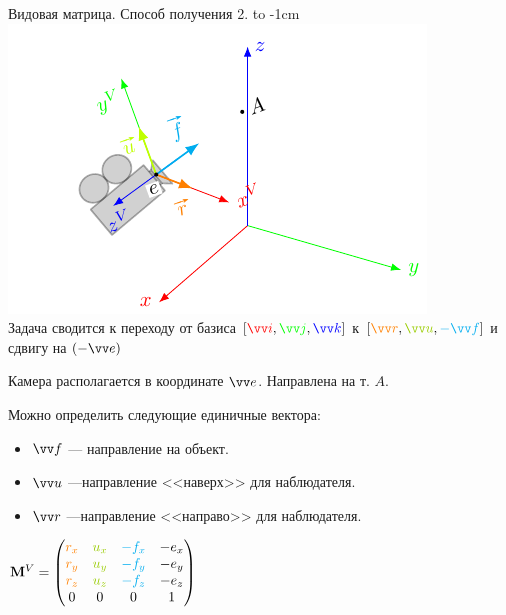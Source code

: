 \documentclass[10pt]{beamer}
\begin{document}
	\begin{frame}{Видовая матрица. Способ получения 2.}
		{
			\hbox to -1cm{}\includegraphics[page=1]{camera.pdf} \\
			
			Задача сводится к переходу от базиса $[ 
			    {\color{red}\vv i}  , 
				{\color{green}\vv j }, 
				{\color{blue}\vv k} 
				]$
				к 
				$[ 
				{\color{orange}\vv r},
				{\color{lime!80!black} \vv u} , 
				{\color{cyan} -\vv f} ]$ и сдвигу на $(-\vv e)$
		}
		{
			Камера располагается в координате $\vv e$. Направлена на т. $A$.
			
			Можно определить следующие единичные вектора:
			\begin{itemize}
				\item {\color{cyan}$\vv f$} --- направление на объект. 
				\item {\color{lime!80!black}$\vv u$} ---направление <<наверх>> для наблюдателя.
				\item {\color{orange}$\vv r$} ---направление <<направо>> для наблюдателя.
			\end{itemize}
			
			$\mathbf M^V = 
			\begin{pmatrix}
				{\color{orange}r_x} & {\color{lime!80!black}u_x} & {\color{cyan}-f_x}& -e_x \\
				{\color{orange}r_y} & {\color{lime!80!black}u_y} & {\color{cyan}-f_y}& -e_y \\
				{\color{orange}r_z} & {\color{lime!80!black}u_z} & {\color{cyan}-f_z}& -e_z \\
				0&0&0&1
			\end{pmatrix}$
						
		}
	\end{frame}
	
\end{document}
